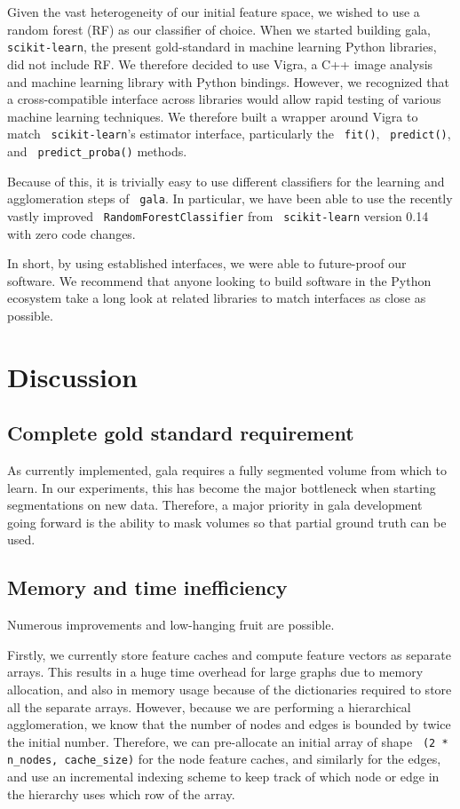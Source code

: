 \documentclass{frontiersSCNS} %
\begin{document}
Given the vast heterogeneity of our initial feature space, we wished to use a random forest (RF) as our classifier of choice.
When we started building gala, \texttt{ \small scikit-learn}, the present gold-standard in machine learning Python libraries, did not include RF.
We therefore decided to use Vigra, a C++ image analysis and machine learning library with Python bindings.
However, we recognized that a cross-compatible interface across libraries would allow rapid testing of various machine learning techniques.
We therefore built a wrapper around Vigra to match \texttt{ \small scikit-learn}'s estimator interface, particularly the \texttt{ \small fit()}, \texttt{ \small predict()}, and \texttt{ \small predict\_proba()} methods.

Because of this, it is trivially easy to use different classifiers for the learning and agglomeration steps of \texttt{ \small gala}.
In particular, we have been able to use the recently vastly improved \texttt{ \small RandomForestClassifier} from \texttt{ \small scikit-learn} version 0.14 with zero code changes.

In short, by using established interfaces, we were able to future-proof our software.
We recommend that anyone looking to build software in the Python ecosystem take a long look at related libraries to match interfaces as close as possible.


\section{Discussion}


\subsection{Complete gold standard requirement}

As currently implemented, gala requires a fully segmented volume from which to learn.
In our experiments, this has become the major bottleneck when starting segmentations on new data.
Therefore, a major priority in gala development going forward is the ability to mask volumes so that partial ground truth can be used.

\subsection{Memory and time inefficiency}

Numerous improvements and low-hanging fruit are possible.

Firstly, we currently store feature caches and compute feature vectors as separate arrays.
This results in a huge time overhead for large graphs due to memory allocation, and also in memory usage because of the dictionaries required to store all the separate arrays.
However, because we are performing a hierarchical agglomeration, we know that the number of nodes and edges is bounded by twice the initial number.
Therefore, we can pre-allocate an initial array of shape \texttt{ \small (2 * n\_nodes, cache\_size)} for the node feature caches, and similarly for the edges, and use an incremental indexing scheme to keep track of which node or edge in the hierarchy uses which row of the array.
\end{document}
